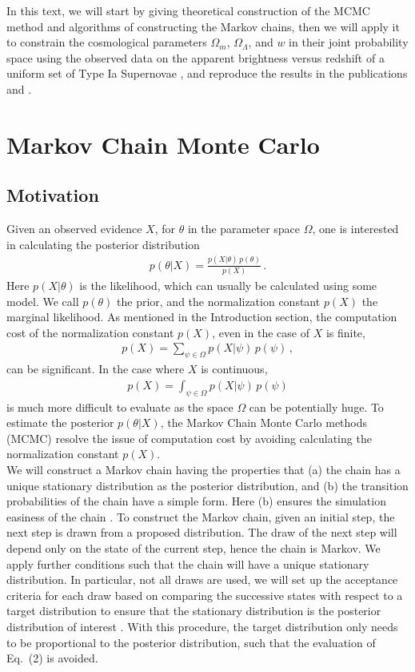 \documentclass[11pt]{article}
\theoremstyle{break}
\theoremstyle{break}
\begin{document}
{}\qquad In this text, we will start by giving theoretical construction of the MCMC method and algorithms of constructing the Markov chains, then we will apply it to constrain the cosmological parameters $\Omega_m$, $\Omega_{\Lambda}$, and $w$ in their joint probability space using the observed data on the apparent brightness versus redshift of a uniform set of Type Ia Supernovae \cite{U21}, and reproduce the results in the publications \cite{U21} and \cite{U2}.


\section{Markov Chain Monte Carlo}
\subsection{Motivation}
{}\qquad Given an observed evidence $X$, for $\theta$ in the parameter space $\Omega$, one is interested in calculating the posterior distribution
\begin{align}
p(\theta | X) = \frac{p(X|\theta) \, p(\theta)}{p(X)}\,.
\end{align}
Here $p(X|\theta)$ is the likelihood, which can usually be calculated using some model. We call $p(\theta)$ the prior, and the normalization constant $p(X)$ the marginal likelihood. As mentioned in the Introduction section, the computation cost of the normalization constant $p(X)$, even in the case of $X$ is finite,
\begin{align*}
p(X) = \sum_{\psi \in \Omega} p(X|\psi) \, p(\psi)\,,
\end{align*}
can be significant. In the case where $X$ is continuous, 
\begin{align}
p(X) = \int_{\psi \in \Omega} p(X|\psi)\, p(\psi)
\end{align}
is much more difficult to evaluate as the space $\Omega$ can be potentially huge. To estimate the posterior $p(\theta|X)$, the Markov Chain Monte Carlo methods (MCMC) resolve the issue of computation cost by avoiding calculating the normalization constant $p(X)$.\\

${}$\qquad We will construct a Markov chain having the properties that (a) the chain has a unique stationary distribution as the posterior distribution, and (b) the transition probabilities of the chain have a simple form. Here (b) ensures the simulation easiness of the chain \cite{txt}. To construct the Markov chain, given an initial step, the next step is drawn from a proposed distribution. The draw of the next step will depend only on the state of the current step, hence the chain is Markov. We apply further conditions such that the chain will have a unique stationary distribution. In particular, not all draws are used, we will set up the acceptance criteria for each draw based on comparing the successive states with respect to a target distribution to ensure that the stationary distribution is the posterior distribution of interest \cite{Duke}. With this procedure, the target distribution only needs to be proportional to the posterior distribution, such that the evaluation of Eq.\ (2) is avoided.
 
\end{document}
